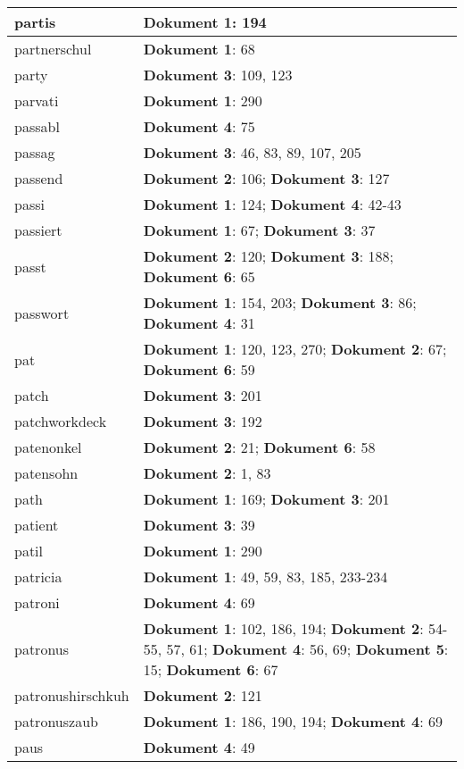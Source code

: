 \documentclass[a5paper]{article}
\begin{document}
\begin{longtable}[l]{|l|p{3in}|}
partis & \textbf{Dokument 1}: 194 \\
\hline
partnerschul & \textbf{Dokument 1}: 68 \\
\hline
party & \textbf{Dokument 3}: 109, 123 \\
\hline
parvati & \textbf{Dokument 1}: 290 \\
\hline
passabl & \textbf{Dokument 4}: 75 \\
\hline
passag & \textbf{Dokument 3}: 46, 83, 89, 107, 205 \\
\hline
passend & \textbf{Dokument 2}: 106; \textbf{Dokument 3}: 127 \\
\hline
passi & \textbf{Dokument 1}: 124; \textbf{Dokument 4}: 42-43 \\
\hline
passiert & \textbf{Dokument 1}: 67; \textbf{Dokument 3}: 37 \\
\hline
passt & \textbf{Dokument 2}: 120; \textbf{Dokument 3}: 188; \textbf{Dokument 6}: 65 \\
\hline
passwort & \textbf{Dokument 1}: 154, 203; \textbf{Dokument 3}: 86; \textbf{Dokument 4}: 31 \\
\hline
pat & \textbf{Dokument 1}: 120, 123, 270; \textbf{Dokument 2}: 67; \textbf{Dokument 6}: 59 \\
\hline
patch & \textbf{Dokument 3}: 201 \\
\hline
patchworkdeck & \textbf{Dokument 3}: 192 \\
\hline
patenonkel & \textbf{Dokument 2}: 21; \textbf{Dokument 6}: 58 \\
\hline
patensohn & \textbf{Dokument 2}: 1, 83 \\
\hline
path & \textbf{Dokument 1}: 169; \textbf{Dokument 3}: 201 \\
\hline
patient & \textbf{Dokument 3}: 39 \\
\hline
patil & \textbf{Dokument 1}: 290 \\
\hline
patricia & \textbf{Dokument 1}: 49, 59, 83, 185, 233-234 \\
\hline
patroni & \textbf{Dokument 4}: 69 \\
\hline
patronus & \textbf{Dokument 1}: 102, 186, 194; \textbf{Dokument 2}: 54-55, 57, 61; \textbf{Dokument 4}: 56, 69; \textbf{Dokument 5}: 15; \textbf{Dokument 6}: 67 \\
\hline
patronushirschkuh & \textbf{Dokument 2}: 121 \\
\hline
patronuszaub & \textbf{Dokument 1}: 186, 190, 194; \textbf{Dokument 4}: 69 \\
\hline
paus & \textbf{Dokument 4}: 49 \\

\end{longtable}
\end{document}
